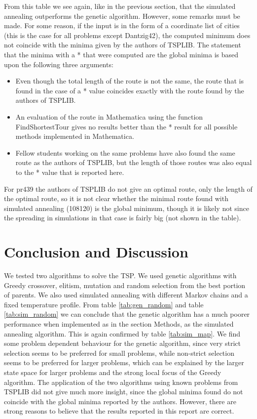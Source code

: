 \documentclass[10pt,a4paper]{article}
\begin{document}
From this table we see again, like in the previous section, that the simulated annealing outperforms the genetic algorithm. However, some remarks must be made. For some reason, if the input is in the form of a coordinate list of cities (this is the case for all problems except Dantzig42), the computed minimum does not coincide with the minima given by the authors of TSPLIB. The statement that the minima with a * that were computed are the global minima is based upon the following three arguments:
\begin{itemize}
\item 
  Even though the total length of the route is not the same, the route that is found in the case of a * value coincides exactly with the route found by the authors of TSPLIB.
\item
  An evaluation of the route in Mathematica using the function FindShortestTour gives no results better than the * result for all possible methods implemented in Mathematica.
\item
  Fellow students working on the same problems have also found the same route as the authors of TSPLIB, but the length of those routes was also equal to the * value that is reported here.
\end{itemize}
For pr439 the authors of TSPLIB do not give an optimal route, only the length of the optimal route, so it is not clear whether the minimal route found with simulated annealing (108120) is the global minimum, though it is likely not since the spreading in simulations in that case is fairly big (not shown in the table).

\section{Conclusion and Discussion}

We tested two algorithms to solve the TSP. We used genetic algorithms with Greedy crossover, elitism, mutation and random selection from the best portion of parents. We also used simulated annealing with different Markov chains and a fixed temperature profile. From table \ref{tab:gen_random} and table \ref{tab:sim_random} we can conclude that the genetic algorithm has a much poorer performance when implemented as in the section Methods, as the simulated annealing algorithm. This is again confirmed by table \ref{tab:sim_map}. We find some problem dependent behaviour for the genetic algorithm, since very strict selection seems to be preferred for small problems, while non-strict selection seems to be preferred for larger problems, which can be explained by the larger state space for larger problems and the strong local focus of the Greedy algorithm. The application of the two algorithms using known problems from TSPLIB did not give much more insight, since the global minima found do not coincide with the global minima reported by the authors. However, there are strong reasons to believe that the results reported in this report are correct.
\end{document}
